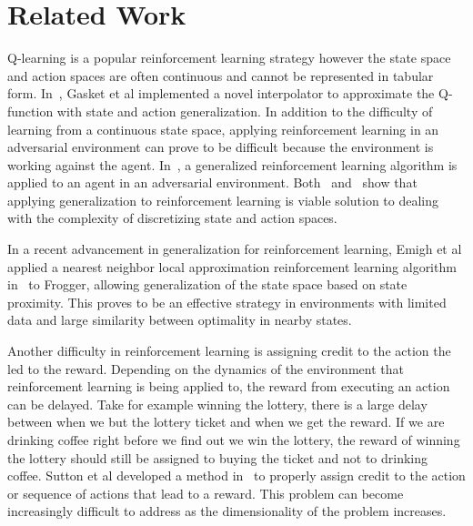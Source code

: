\section{Related Work}

Q-learning is a popular reinforcement learning strategy however the state space and action spaces are often continuous and cannot be represented in tabular form. In~\cite{gaskett}, Gasket et al implemented a novel interpolator to approximate the Q-function with state and action generalization. In addition to the difficulty of learning from a continuous state space, applying reinforcement learning in an adversarial environment can prove to be difficult because the environment is working against the agent. In~\cite{uther}, a generalized reinforcement learning algorithm is applied to an agent in an adversarial environment. Both~\cite{gaskett} and~\cite{uther} show that applying generalization to reinforcement learning is viable solution to dealing with the complexity of discretizing state and action spaces. 

In a recent advancement in generalization for reinforcement learning, Emigh et al applied a nearest neighbor local approximation reinforcement learning algorithm in~\cite{emigh} to Frogger, allowing generalization of the state space based on state proximity. This proves to be an effective strategy in environments with limited data and large similarity between optimality in nearby states.

Another difficulty in reinforcement learning is assigning credit to the action the led to the reward. Depending on the dynamics of the environment that reinforcement learning is being applied to, the reward from executing an action can be delayed. Take for example winning the lottery, there is a large delay between when we but the lottery ticket and when we get the reward. If we are drinking coffee right before we find out we win the lottery, the reward of winning the lottery should still be assigned to buying the ticket and not to drinking coffee. Sutton et al developed a method in~\cite{sutton} to properly assign credit to the action or sequence of actions that lead to a reward. This problem can become increasingly difficult to address as the dimensionality of the problem increases.       
